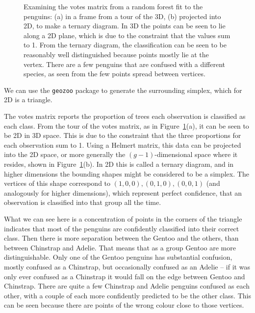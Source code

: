 \documentclass[
  letterpaper,
]{krantz}
\begin{document}
\begin{figure}
\begin{minipage}{0.50\linewidth}
{}


\end{minipage}%

\caption{\label{fig-penguins-votes-pdf}Examining the votes matrix from a
random forest fit to the penguins: (a) in a frame from a tour of the 3D,
(b) projected into 2D, to make a ternary diagram. In 3D the points can
be seen to lie along a 2D plane, which is due to the constraint that the
values sum to 1. From the ternary diagram, the classification can be
seen to be reasonably well distinguished because points mostly lie at
the vertex. There are a few penguins that are confused with a different
species, as seen from the few points spread between vertices.}

\end{figure}%

We can use the \texttt{geozoo} package to generate the surrounding
simplex, which for 2D is a triangle.

The votes matrix reports the proportion of trees each observation is
classified as each class. From the tour of the votes matrix, as in
Figure~\ref{fig-penguins-votes-pdf}(a), it can be seen to be 2D in 3D
space. This is due to the constraint that the three proportions for each
observation sum to 1. Using a Helmert matrix, this data can be projected
into the 2D space, or more generally the \((g-1)\)-dimensional space
where it resides, shown in Figure~\ref{fig-penguins-votes-pdf}(b). In 2D
this is called a ternary diagram, and in higher dimensions the bounding
shapes might be considered to be a simplex. The vertices of this shape
correspond to \((1,0,0), (0,1,0), (0,0,1)\) (and analogously for higher
dimensions), which represent perfect confidence, that an observation is
classified into that group all the time.

What we can see here is a concentration of points in the corners of the
triangle indicates that most of the penguins are confidently classified
into their correct class. Then there is more separation between the
Gentoo and the others, than between Chinstrap and Adelie. That means
that as a group Gentoo are more distinguishable. Only one of the Gentoo
penguins has substantial confusion, mostly confused as a Chinstrap, but
occasionally confused as an Adelie -- if it was only ever confused as a
Chinstrap it would fall on the edge between Gentoo and Chinstrap. There
are quite a few Chinstrap and Adelie penguins confused as each other,
with a couple of each more confidently predicted to be the other class.
This can be seen because there are points of the wrong colour close to
those vertices.
\end{document}
